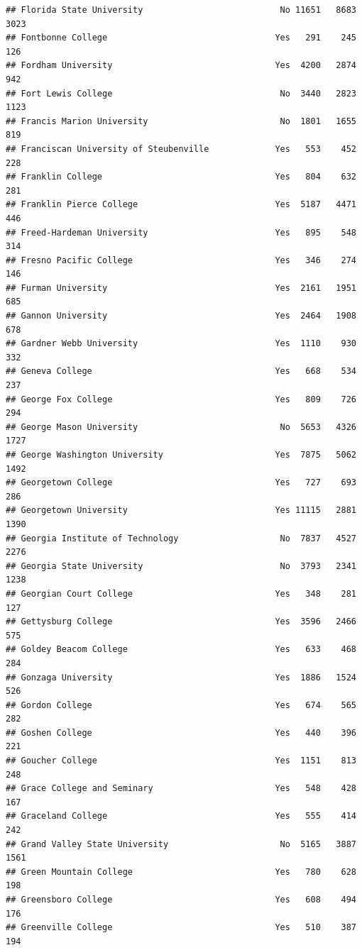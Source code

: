 \documentclass[
]{article}
\begin{document}
\begin{verbatim}
## Florida State University                           No 11651   8683   3023
## Fontbonne College                                 Yes   291    245    126
## Fordham University                                Yes  4200   2874    942
## Fort Lewis College                                 No  3440   2823   1123
## Francis Marion University                          No  1801   1655    819
## Franciscan University of Steubenville             Yes   553    452    228
## Franklin College                                  Yes   804    632    281
## Franklin Pierce College                           Yes  5187   4471    446
## Freed-Hardeman University                         Yes   895    548    314
## Fresno Pacific College                            Yes   346    274    146
## Furman University                                 Yes  2161   1951    685
## Gannon University                                 Yes  2464   1908    678
## Gardner Webb University                           Yes  1110    930    332
## Geneva College                                    Yes   668    534    237
## George Fox College                                Yes   809    726    294
## George Mason University                            No  5653   4326   1727
## George Washington University                      Yes  7875   5062   1492
## Georgetown College                                Yes   727    693    286
## Georgetown University                             Yes 11115   2881   1390
## Georgia Institute of Technology                    No  7837   4527   2276
## Georgia State University                           No  3793   2341   1238
## Georgian Court College                            Yes   348    281    127
## Gettysburg College                                Yes  3596   2466    575
## Goldey Beacom College                             Yes   633    468    284
## Gonzaga University                                Yes  1886   1524    526
## Gordon College                                    Yes   674    565    282
## Goshen College                                    Yes   440    396    221
## Goucher College                                   Yes  1151    813    248
## Grace College and Seminary                        Yes   548    428    167
## Graceland College                                 Yes   555    414    242
## Grand Valley State University                      No  5165   3887   1561
## Green Mountain College                            Yes   780    628    198
## Greensboro College                                Yes   608    494    176
## Greenville College                                Yes   510    387    194

\end{verbatim}
\end{document}
